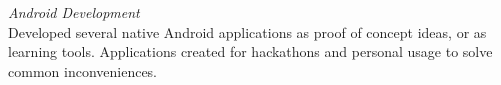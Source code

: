 \documentclass[]{res}
\begin{document}
{			\textit{Android Development}\\
			Developed several native Android applications as proof of concept ideas, or as learning tools. Applications created for hackathons and personal usage to solve common inconveniences.
			

			



	}
		
%
%
%			
%			
%			
%			
%
%			
%	

\end{document}

